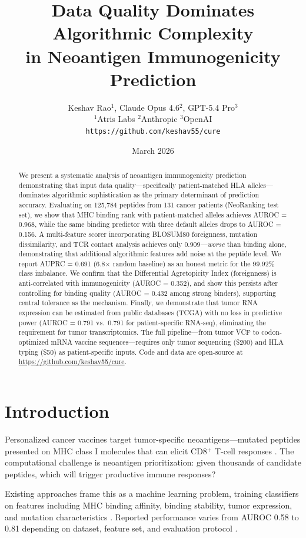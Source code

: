 \documentclass[11pt,twocolumn]{article}
\title{\textbf{Data Quality Dominates Algorithmic Complexity\\in Neoantigen Immunogenicity Prediction}}
\author{Keshav Rao$^{1}$, Claude Opus 4.6$^{2}$, GPT-5.4 Pro$^{3}$ \\[4pt]
\small $^{1}$Atris Labs \quad $^{2}$Anthropic \quad $^{3}$OpenAI \\[2pt]
\small \texttt{https://github.com/keshav55/cure}}
\date{March 2026}
\begin{document}
\maketitle

\begin{abstract}
We present a systematic analysis of neoantigen immunogenicity prediction demonstrating that input data quality---specifically patient-matched HLA alleles---dominates algorithmic sophistication as the primary determinant of prediction accuracy. Evaluating on 125,784 peptides from 131 cancer patients (NeoRanking test set), we show that MHC binding rank with patient-matched alleles achieves AUROC = 0.968, while the same binding predictor with three default alleles drops to AUROC = 0.156. A multi-feature scorer incorporating BLOSUM80 foreignness, mutation dissimilarity, and TCR contact analysis achieves only 0.909---\textit{worse} than binding alone, demonstrating that additional algorithmic features add noise at the peptide level. We report AUPRC = 0.691 (6.8$\times$ random baseline) as an honest metric for the 99.92\% class imbalance. We confirm that the Differential Agretopicity Index (foreignness) is anti-correlated with immunogenicity (AUROC = 0.352), and show this persists after controlling for binding quality (AUROC = 0.432 among strong binders), supporting central tolerance as the mechanism. Finally, we demonstrate that tumor RNA expression can be estimated from public databases (TCGA) with no loss in predictive power (AUROC = 0.791 vs.\ 0.791 for patient-specific RNA-seq), eliminating the requirement for tumor transcriptomics. The full pipeline---from tumor VCF to codon-optimized mRNA vaccine sequences---requires only tumor sequencing (\$200) and HLA typing (\$50) as patient-specific inputs. Code and data are open-source at \url{https://github.com/keshav55/cure}.
\end{abstract}

\section{Introduction}

Personalized cancer vaccines target tumor-specific neoantigens---mutated peptides presented on MHC class I molecules that can elicit CD8$^{+}$ T-cell responses \cite{ott2017, carreno2015}. The computational challenge is neoantigen prioritization: given thousands of candidate peptides, which will trigger productive immune responses?

Existing approaches frame this as a machine learning problem, training classifiers on features including MHC binding affinity, binding stability, tumor expression, and mutation characteristics \cite{wells2020tesla, muller2023neoranking, li2021deepimmuno}. Reported performance varies from AUROC 0.58 to 0.81 depending on dataset, feature set, and evaluation protocol \cite{muller2023neoranking}.
\end{document}

